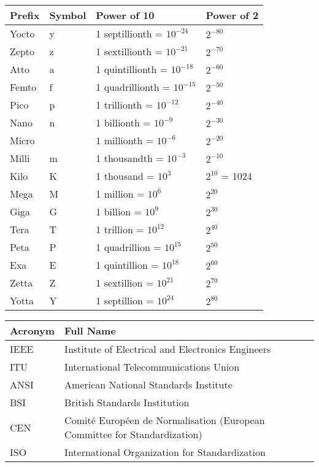 




\begin{NxLightBox}[title={Common Numerical Prefixes Used for Computers}]
	\begin{tabularx}{\textwidth}{|X|l|X|X|}
		\toprule
		Prefix & Symbol &  Power of 10 & Power of 2 \\
		\midrule
		Yocto & y & 1 septillionth = $10^{-24}$ & $2^{-80}$ \\
		Zepto & z & 1 sextillionth = $10^{-21}$ & $2^{-70}$ \\
		Atto & a & 1 quintillionth = $10^{-18}$ & $2^{-60}$ \\
		Femto & f & 1 quadrillionth = $10^{-15}$ & $2^{-50}$ \\
		Pico & p & 1 trillionth = $10^{-12}$ & $2^{-40}$ \\
		Nano & n & 1 billionth = $10^{-9}$ & $2^{-30}$ \\
		Micro & \textmu & 1 millionth = $10^{-6}$ & $2^{-20}$ \\
		Milli & m & 1 thousandth = $10^{-3}$ & $2^{-10}$ \\
		Kilo & K & 1 thousand = $10^3$ & $2^{10}$ = 1024 \\
		Mega & M & 1 million = $10^6$ & $2^{20}$ \\
		Giga & G & 1 billion = $10^9$ & $2^{30}$ \\
		Tera & T & 1 trillion = $10^{12}$ & $2^{40}$ \\
		Peta & P & 1 quadrillion = $10^{15}$ & $2^{50}$ \\
		Exa & E & 1 quintillion = $10^{18}$ & $2^{60}$ \\
		Zetta & Z & 1 sextillion = $10^{21}$ & $2^{70}$ \\
		Yotta & Y & 1 septillion = $10^{24}$ & $2^{80}$ \\
		\bottomrule
	\end{tabularx}
\end{NxLightBox}



\begin{NxLightBox}[title={International Standards Bodies}]
	\begin{tabularx}{\textwidth}{|l|X|}
		\toprule
		Acronym & Full Name \\
		\midrule
		IEEE & Institute of Electrical and Electronics Engineers \\
		ITU & International Telecommunications Union \\
		ANSI & American National Standards Institute \\
		BSI & British Standards Institution \\
		CEN & Comité Européen de Normalisation (European Committee for Standardization) \\
		ISO & International Organization for Standardization \\
		\bottomrule
	\end{tabularx}
\end{NxLightBox}

